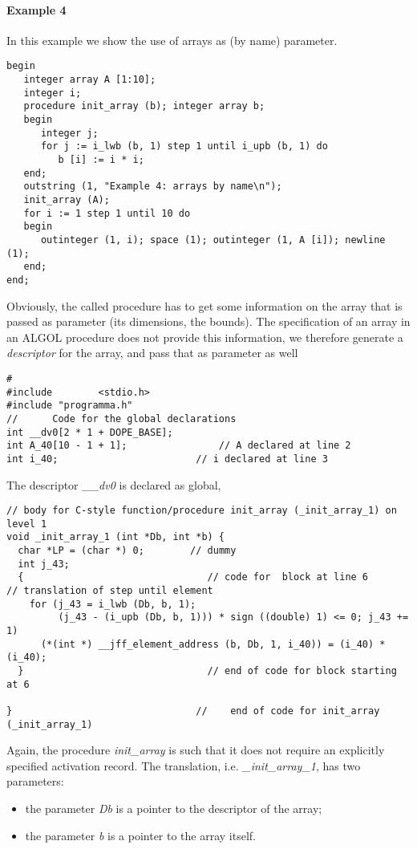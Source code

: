 \documentclass[11pt]{article}
\begin{document}
\paragraph{Example 4}
In this example we show the use of arrays as (by name) parameter.
{\footnotesize
\begin{verbatim}
begin
   integer array A [1:10];
   integer i;
   procedure init_array (b); integer array b;
   begin
      integer j;
      for j := i_lwb (b, 1) step 1 until i_upb (b, 1) do
         b [i] := i * i;
   end;
   outstring (1, "Example 4: arrays by name\n");
   init_array (A);
   for i := 1 step 1 until 10 do
   begin
      outinteger (1, i); space (1); outinteger (1, A [i]); newline (1);
   end;
end;
\end{verbatim}
}
Obviously, the called procedure has to get some information
on the array that is passed as parameter (its dimensions, the bounds).
The specification of an array in an ALGOL procedure
does not provide this information,
we therefore generate a  {\em descriptor}
for the array, and pass that as parameter as well
{\footnotesize
\begin{verbatim}
#
#include        <stdio.h>
#include "programma.h"
//      Code for the global declarations
int __dv0[2 * 1 + DOPE_BASE];
int A_40[10 - 1 + 1];                // A declared at line 2
int i_40;                        // i declared at line 3
\end{verbatim}
}
The descriptor {\em \_\_dv0} is declared as global,
{\footnotesize
\begin{verbatim}
// body for C-style function/procedure init_array (_init_array_1) on level 1
void _init_array_1 (int *Db, int *b) {
  char *LP = (char *) 0;        // dummy
  int j_43;
  {                                // code for  block at line 6 
// translation of step until element
    for (j_43 = i_lwb (Db, b, 1);
         (j_43 - (i_upb (Db, b, 1))) * sign ((double) 1) <= 0; j_43 += 1)
      (*(int *) __jff_element_address (b, Db, 1, i_40)) = (i_40) * (i_40);
  }                                // end of code for block starting at 6

}                                //    end of code for init_array (_init_array_1)
\end{verbatim}
}
Again, the procedure {\em init\_array} is such that it does not require
an explicitly specified activation record. The translation, i.e.
{\em \_init\_array\_1}, has two parameters:
\begin{itemize}
\item the parameter {\em Db} is a pointer to the descriptor of
the array;
\item the parameter {\em b} is a pointer to the array itself.
\end{itemize}
\end{document}
